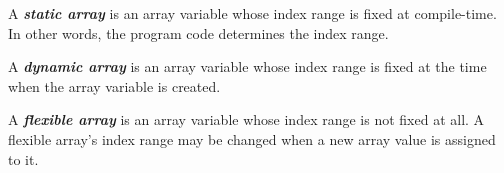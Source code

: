 A \textit{\textbf{static array}} is an array variable whose index range is fixed at compile-time. In other words, the program code determines the index range.

A \textit{\textbf{dynamic array}} is an array variable whose index range is fixed at the time when the array variable is created.

A \textit{\textbf{flexible array}} is an array variable whose index range is not fixed at all. A flexible array's index range may be changed when a new array value is assigned to it.
